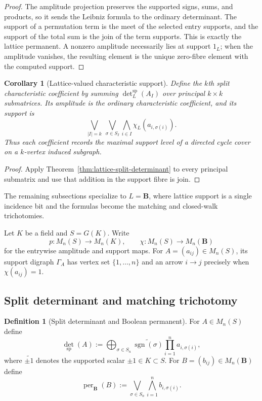 \documentclass[11pt]{amsart}
\numberwithin{equation}{section}
\newtheorem{corollary}[theorem]{Corollary}
\theoremstyle{definition}
\newtheorem{definition}[theorem]{Definition}
\newcommand{\B}{\mathbf B}
\newcommand{\detsp}{\operatorname{det}_{\mathrm{sp}}}
\begin{document}
\begin{proof}
The amplitude projection preserves the supported signs, sums, and products,
so it sends the Leibniz formula to the ordinary determinant.  The support
of a permutation term is the meet of the selected entry supports, and the
support of the total sum is the join of the term supports.  This is exactly
the lattice permanent.  A nonzero amplitude necessarily lies at support
$1_L$; when the amplitude vanishes, the resulting element is the unique
zero-fibre element with the computed support.
\end{proof}

\begin{corollary}[Lattice-valued characteristic support]
\label{cor:lattice-characteristic-support}
Define the $k$th split characteristic coefficient by summing
$\det^{\mathrm{sp}}_L(A_I)$ over principal $k\times k$ submatrices.  Its
amplitude is the ordinary characteristic coefficient, and its support is
\[
\bigvee_{|I|=k}\ \bigvee_{\sigma\in S_I}
\bigwedge_{i\in I}\chi_L(a_{i,\sigma(i)}).
\]
Thus each coefficient records the maximal support level of a directed
cycle cover on a $k$-vertex induced subgraph.
\end{corollary}

\begin{proof}
Apply Theorem~\ref{thm:lattice-split-determinant} to every principal
submatrix and use that addition in the support fibre is join.
\end{proof}

The remaining subsections specialize to $L=\B$, where lattice support is a
single incidence bit and the formulas become the matching and closed-walk
trichotomies.

Let $K$ be a field and $S=G(K)$.  Write
\[
p:M_n(S)\longrightarrow M_n(K),
\qquad
\chi:M_n(S)\longrightarrow M_n(\B)
\]
for the entrywise amplitude and support maps.  For
$A=(a_{ij})\in M_n(S)$, its support digraph $\Gamma_A$ has vertex set
$\{1,\dots,n\}$ and an arrow $i\to j$ precisely when
$\chi(a_{ij})=1$.

\subsection{Split determinant and matching trichotomy}

\begin{definition}[Split determinant and Boolean permanent]
For $A\in M_n(S)$ define
\[
\detsp(A)
:=
\bigoplus_{\sigma\in S_n}
\widetilde{\operatorname{sgn}(\sigma)}
\prod_{i=1}^n a_{i,\sigma(i)},
\]
where $\widetilde{\pm1}$ denotes the supported scalar $\pm1\in K\subset S$.
For $B=(b_{ij})\in M_n(\B)$ define
\[
\operatorname{per}_{\B}(B)
:=
\bigvee_{\sigma\in S_n}
\bigwedge_{i=1}^n b_{i,\sigma(i)}.
\]
\end{definition}
\end{document}
